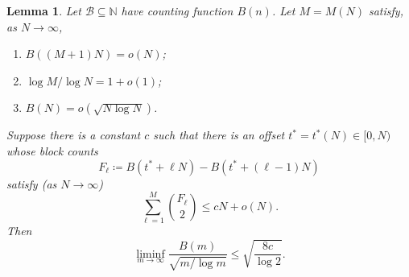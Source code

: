 \documentclass[10pt,a4paper]{amsart}
\newtheorem{lem}{Lemma}
\newcommand{\NN}{\ensuremath{\mathbb N}}
\newcommand{\cB}{\mathcal{B}}
\begin{document}
\begin{lem}\label{lem:energy}
Let $\cB\subseteq\NN$ have counting function $B(n)$.
Let $M=M(N)$ satisfy, as $N\to\infty$,
\begin{enumerate}[label=\textit{(\roman*)},noitemsep]
  \item\label{eng:window} $B((M+1)N)=o(N)$;
  \item\label{eng:ratio} $\log M/\log N =1+o( 1 )$;
  \item\label{eng:head} $B(N)=o(\sqrt{N \log N})$.
\end{enumerate}
Suppose there is a constant $c$ such that there is an
offset $t^\ast=t^\ast(N)\in[0,N)$ whose block counts
  \begin{equation*}\label{hyp:blocks}
    F_\ell \coloneqq B(t^\ast+\ell N)- B(t^\ast+(\ell-1)N)
  \end{equation*}
satisfy (as $N\to\infty$)
  \begin{equation}\label{hyp:energy}
    \sum_{\ell=1}^{M}\binom{F_\ell}{2}\le cN+o(N).
  \end{equation}
Then
  \[\liminf_{m\to\infty}\frac{B(m)}{\sqrt{m/\log m}}\le \sqrt{\frac{8c}{\log 2}}.\]
\end{lem}
\end{document}
